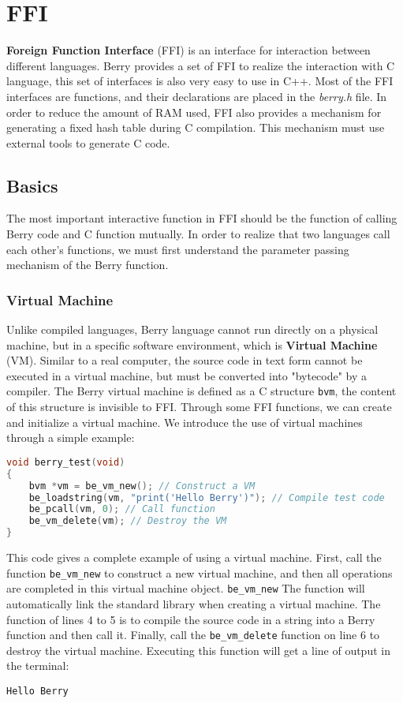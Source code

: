 \chapter{FFI}

\textbf{Foreign Function Interface} (FFI) is an interface for interaction between different languages. Berry provides a set of FFI to realize the interaction with C language, this set of interfaces is also very easy to use in C++. Most of the FFI interfaces are functions, and their declarations are placed in the \textsl{berry.h} file. In order to reduce the amount of RAM used, FFI also provides a mechanism for generating a fixed hash table during C compilation. This mechanism must use external tools to generate C code.

\section {Basics}

The most important interactive function in FFI should be the function of calling Berry code and C function mutually. In order to realize that two languages   call each other's functions, we must first understand the parameter passing mechanism of the Berry function.

\subsection {Virtual Machine}

Unlike compiled languages, Berry language cannot run directly on a physical machine, but in a specific software environment, which is \textbf{Virtual Machine} (VM). Similar to a real computer, the source code in text form cannot be executed in a virtual machine, but must be converted into "bytecode" by a compiler. The Berry virtual machine is defined as a C structure \texttt{bvm}, the content of this structure is invisible to FFI. Through some FFI functions, we can create and initialize a virtual machine. We introduce the use of virtual machines through a simple example:
\begin{lstlisting}[language=c, style=berry]
void berry_test(void)
{
    bvm *vm = be_vm_new(); // Construct a VM
    be_loadstring(vm, "print('Hello Berry')"); // Compile test code
    be_pcall(vm, 0); // Call function
    be_vm_delete(vm); // Destroy the VM
}
\end{lstlisting}
This code gives a complete example of using a virtual machine. First, call the function \texttt{be\_vm\_new} to construct a new virtual machine, and then all operations are completed in this virtual machine object. \texttt{be\_vm\_new} The function will automatically link the standard library when creating a virtual machine. The function of lines 4 to 5 is to compile the source code in a string into a Berry function and then call it. Finally, call the \texttt{be\_vm\_delete} function on line 6 to destroy the virtual machine. Executing this function will get a line of output in the terminal:
\begin{lstlisting}[numbers=none]
Hello Berry
\end{lstlisting}

